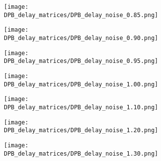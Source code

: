 \begin{figure}[H] \ContinuedFloat%
    \centering
    \begin{subfigure}{0.48\textwidth}
        \texttt{[image: DPB\_delay\_matrices/DPB\_delay\_noise\_0.85.png]}
        \caption{} %
    \end{subfigure}\hfill
    \begin{subfigure}{0.48\textwidth}
        \texttt{[image: DPB\_delay\_matrices/DPB\_delay\_noise\_0.90.png]}
        \caption{} %
    \end{subfigure}

    \bigskip %

    \begin{subfigure}{0.48\textwidth}
        \texttt{[image: DPB\_delay\_matrices/DPB\_delay\_noise\_0.95.png]}
        \caption{} %
    \end{subfigure}\hfill
    \begin{subfigure}{0.48\textwidth}
        \texttt{[image: DPB\_delay\_matrices/DPB\_delay\_noise\_1.00.png]}
        \caption{} %
    \end{subfigure}
\end{figure}

\begin{figure}[H] \ContinuedFloat%
    \centering
    \begin{subfigure}{0.48\textwidth}
        \texttt{[image: DPB\_delay\_matrices/DPB\_delay\_noise\_1.10.png]}
        \caption{} %
    \end{subfigure}\hfill
    \begin{subfigure}{0.48\textwidth}
        \texttt{[image: DPB\_delay\_matrices/DPB\_delay\_noise\_1.20.png]}
        \caption{} %
    \end{subfigure}

    \bigskip %

    \begin{subfigure}{0.48\textwidth}
        \texttt{[image: DPB\_delay\_matrices/DPB\_delay\_noise\_1.30.png]}
        \caption{} %
    \end{subfigure}
\end{figure}
\pagebreak

